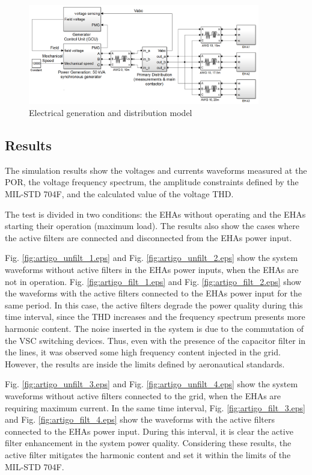 \begin{figure}[!tb] %
	\centering
	\includegraphics[width=0.9\textwidth]{Figures/simulacao_simulink.png}
	\caption{Electrical generation and distribution model}
	\label{fig:simulacao_simulink.png}
\end{figure}

\subsection{Results}

The simulation results show the voltages and currents waveforms measured at the POR, the voltage frequency spectrum, the amplitude constraints defined by the MIL-STD 704F, and the calculated value of the voltage THD.

The test is divided in two conditions: the EHAs without operating and the EHAs starting their operation (maximum load). The results also show the cases where the active filters are connected and disconnected from the EHAs power input.

Fig. \ref{fig:artigo_unfilt_1.eps} and Fig. \ref{fig:artigo_unfilt_2.eps} show the system waveforms without active filters in the EHAs power inputs, when the EHAs are not in operation. Fig. \ref{fig:artigo_filt_1.eps} and Fig. \ref{fig:artigo_filt_2.eps} show the waveforms with the active filters connected to the EHAs power input for the same period. In this case, the active filters degrade the power quality during this time interval, since the THD increases and the frequency spectrum presents more harmonic content. The noise inserted in the system is due to the commutation of the VSC switching devices. Thus, even with the presence of the capacitor filter in the lines, it was observed some high frequency content injected in the grid. However, the results are inside the limits defined by aeronautical standards.

Fig. \ref{fig:artigo_unfilt_3.eps} and Fig. \ref{fig:artigo_unfilt_4.eps} show the system waveforms without active filters connected to the grid, when the EHAs are requiring maximum current. In the same time interval, Fig. \ref{fig:artigo_filt_3.eps} and Fig. \ref{fig:artigo_filt_4.eps} show the waveforms with the active filters connected to the EHAs power input. During this interval, it is clear the active filter enhancement in the system power quality. Considering these results, the active filter mitigates the harmonic content and set it within the limits of the MIL-STD 704F.

